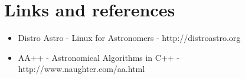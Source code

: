 \section{Links and references}

\begin{itemize}
    \item Distro Astro - Linux for Astronomers - http://distroastro.org
    \item AA++ - Astronomical Algorithms in C++ - http://www.naughter.com/aa.html
\end{itemize}
